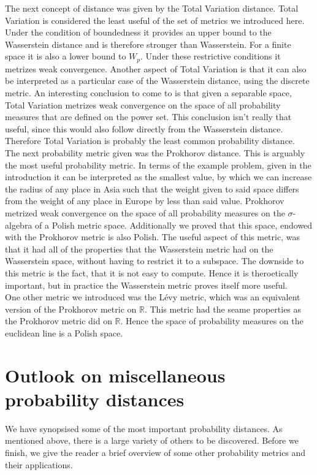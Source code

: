 \documentclass[11pt,a4paper]{article}
\begin{document}
The next concept of distance was given by the Total Variation distance. Total Variation is considered the least useful of the set of metrics we introduced here. Under the condition of boundedness it provides an upper bound to the Wasserstein distance and is therefore stronger than Wasserstein. For a finite space it is also a lower bound to $W_p$. Under these restrictive conditions it metrizes weak convergence. Another aspect of Total Variation is that it can also be interpreted as a particular case of the Wasserstein distance, using the discrete metric. An interesting conclusion to come to is that given a separable space, Total Variation metrizes weak convergence on the space of all probability measures that are defined on the power set. This conclusion isn't really that useful, since this would also follow directly from the Wasserstein distance. Therefore Total Variation is probably the least common probability distance.\vspace{1em}\\
The next probability metric given was the Prokhorov distance. This is arguably the most useful probability metric. In terms of the example problem, given in the introduction it can be interpreted as the smallest value, by which we can increase the radius of any place in Asia such that the weight given to said space differs from the weight of any place in Europe by less than said value. Prokhorov metrized weak convergence on the space of all probability measures on the $\sigma$-algebra of a Polish metric space. Additionally we proved that this space, endowed with the Prokhorov metric is also Polish. The useful aspect of this metric, was that it had all of the properties that the Wasserstein metric had on the Wasserstein space, without having to restrict it to a subspace. The downside to this metric is the fact, that it is not easy to compute. Hence it is theroetically important, but in practice the Wasserstein metric proves itself more useful. \vspace{1em}\\
One other metric we introduced was the Lévy metric, which was an equivalent version of the Prokhorov metric on $\mathbb{R}$. This metric had the seame properties as the Prokhorov metric did on $\mathbb{R}$. Hence the space of probability measures on the euclidean line is a Polish space.     
\section{Outlook on miscellaneous probability distances}
We have synopsised some of the most important probability distances. As mentioned above, there is a large variety of others to be discovered. Before we finish, we give the reader a brief overview of some other probability metrics and their applications. 
\end{document}

